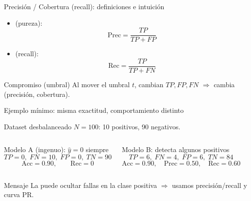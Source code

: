 \begin{frame}{Precisión / Cobertura (recall): definiciones e intuición}

\begin{itemize}
  \item {} (pureza):
  \[
  \mathrm{Prec}=\frac{TP}{TP+FP}
  \]
  \item {} (recall):
  \[
  \mathrm{Rec}=\frac{TP}{TP+FN}
  \]
\end{itemize}

\begin{block}{Compromiso (umbral)}
Al mover el umbral \(t\), cambian \(TP,FP,FN\) \(\Rightarrow\) cambia (precisión, cobertura).
\end{block}
\end{frame}

\begin{frame}{Ejemplo mínimo: misma exactitud, comportamiento distinto}

\small
\begin{block}{Dataset desbalanceado}
\(N=100\): 10 positivos, 90 negativos.
\end{block}

\vspace{-0.4em}
\begin{columns}[t]
\begin{block}{Modelo A (ingenuo): \(\hat{y}=0\) siempre}
\[
TP=0,\; FN=10,\; FP=0,\; TN=90
\]
\[
\mathrm{Acc}=0.90,\qquad \mathrm{Rec}=0
\]
\end{block}

\begin{block}{Modelo B: detecta algunos positivos}
\[
TP=6,\; FN=4,\; FP=6,\; TN=84
\]
\[
\mathrm{Acc}=0.90,\quad \mathrm{Prec}=0.50,\quad \mathrm{Rec}=0.60
\]
\end{block}
\end{columns}

\begin{block}{Mensaje}
La  puede ocultar fallas en la clase positiva \(\Rightarrow\) usamos precisión/recall y curva PR.
\end{block}
\end{frame}

